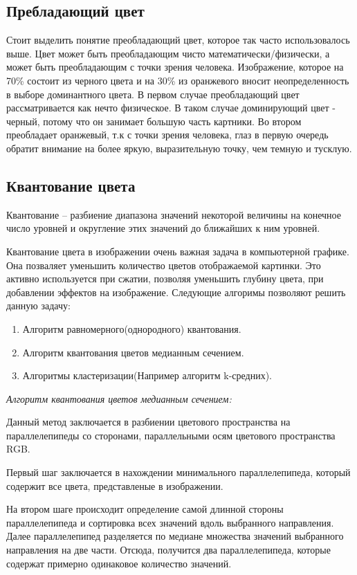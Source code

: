 \subsection{ Пребладающий цвет}
Стоит выделить понятие преобладающий цвет, которое так часто использовалось выше. Цвет может быть преобладающим чисто математически/физически, а может быть преобладающим с точки зрения человека. Изображение, которое на 70\% состоит из черного цвета и на 30\% из оранжевого вносит неопределенность в выборе доминантного цвета. В первом случае преобладающий цвет рассматривается как нечто физическое. В таком случае доминирующий цвет - черный, потому что он занимает большую часть картники. Во втором преобладает оранжевый, т.к с точки зрения человека, глаз в первую очередь обратит внимание на более яркую, выразительную точку, чем темную и тусклую.
\subsection{ Квантование цвета}
Квантование -- разбиение диапазона значений некоторой величины на конечное число уровней и округление этих значений до ближайших к ним уровней.

Квантование цвета в изображении очень важная задача в компьютерной графике. Она позваляет уменьшить количество цветов отображаемой картинки. Это активно используется при сжатии, позволяя уменьшить глубину цвета, при добавлении эффектов на изображение. Следующие алгоримы позволяют решить данную задачу:
\begin{enumerate}
	\item Алгоритм равномерного(однородного) квантования.
	\item Алгоритм квантования цветов медианным сечением.
	\item Алгоритмы кластеризации(Например алгоритм k-средних).
\end{enumerate}

\textit{Алгоритм квантования цветов медианным сечением:}

Данный метод заключается в разбиении цветового пространства на параллелепипеды со сторонами, параллельными осям цветового пространства RGB.

Первый шаг заключается в нахождении минимального параллелепипеда, который содержит все цвета, представленые в изображении.

На втором шаге происходит определение самой длинной стороны параллелепипеда и сортировка всех значений вдоль выбранного направления. Далее параллелепипед разделяется по медиане множества значений выбранного направления на две части. Отсюда, получится два параллелепипеда, которые содержат примерно одинаковое количество значений. 

